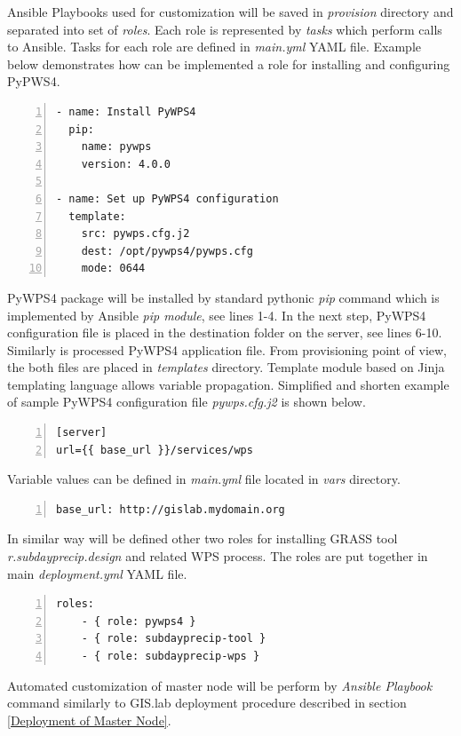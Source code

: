 \documentclass{isprs}
\begin{document}
Ansible Playbooks used for customization will be saved in
\textit{provision} directory and separated into set of
\textit{roles}. Each role is represented by \textit{tasks} which
perform calls to Ansible. Tasks for each role are defined in
\textit{main.yml} YAML file. Example below demonstrates how can be
implemented a role for installing and configuring PyPWS4.

\begin{lstlisting}[numbers=left,xleftmargin=1em]
- name: Install PyWPS4
  pip:
    name: pywps
    version: 4.0.0

- name: Set up PyWPS4 configuration
  template:
    src: pywps.cfg.j2
    dest: /opt/pywps4/pywps.cfg
    mode: 0644
\end{lstlisting}

PyWPS4 package will be installed by standard pythonic \textit{pip}
command which is implemented by Ansible \textit{pip module}, see lines
1-4. In the next step, PyWPS4 configuration file is placed in the
destination folder on the server, see lines 6-10. Simi\-larly is
processed PyWPS4 application file. From provisioning point of view,
the both files are placed in \textit{templates} directory. Template
module based on Jinja templating language allows variable
propagation. Simplified and shorten example of sample PyWPS4
configuration file \textit{pywps.cfg.j2} is shown below.

\begin{lstlisting}[numbers=left,xleftmargin=1em]
[server]
url={{ base_url }}/services/wps
\end{lstlisting}

Variable values can be defined in \textit{main.yml} file located in
\textit{vars} directory.

\begin{lstlisting}[numbers=left,xleftmargin=1em]
base_url: http://gislab.mydomain.org
\end{lstlisting}

In similar way will be defined other two roles for installing GRASS
tool \textit{r.subdayprecip.design} and related WPS process. The roles
are put together in main \textit{deployment.yml} YAML file.

\begin{lstlisting}[numbers=left,xleftmargin=1em]
roles:
    - { role: pywps4 }
    - { role: subdayprecip-tool }
    - { role: subdayprecip-wps }
\end{lstlisting}

Automated customization of master node will be perform by
\textit{Ansible Playbook} command similarly to GIS.lab deployment
procedure described in section \ref{Deployment of Master Node}.
\end{document}

